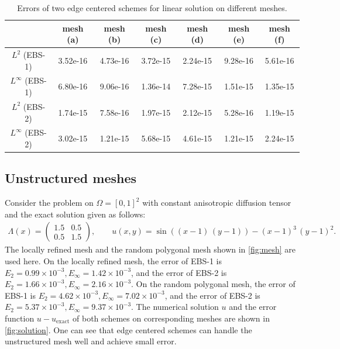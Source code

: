 \documentclass[times,review,preprint,authoryear]{elsarticle}
\begin{document}
\begin{table}[h]
\centering
\begin{tabular}{ccccccc}
\hline
 & mesh (a) & mesh (b) & mesh (c) & mesh (d) & mesh (e) & mesh (f) \\
\hline
$L^2$ (EBS-1) & 3.52e-16 & 4.73e-16 & 3.72e-15 & 2.24e-15 & 9.28e-16 & 5.61e-16 \\
$L^\infty$ (EBS-1) & 6.80e-16 & 9.06e-16 & 1.36e-14 & 7.28e-15 & 1.51e-15 & 1.35e-15 \\
$L^2$ (EBS-2) & 1.74e-15 & 7.58e-16 & 1.97e-15 & 2.12e-15 & 5.28e-16 & 1.19e-15 \\
$L^\infty$ (EBS-2) & 3.02e-15 & 1.21e-15 & 5.68e-15 & 4.61e-15 & 1.21e-15 & 2.24e-15 \\
\hline
\end{tabular}
\caption{Errors of two edge centered schemes for linear solution on different meshes.}
\label{tab:linear}
\end{table}

\subsection{Unstructured meshes}

Consider the problem on $\Omega = [0,1]^2$ with constant anisotropic diffusion tensor and the exact solution given as follows:
\begin{align*}
\Lambda(x) =
\left(
\begin{matrix}
1.5 & 0.5 \\
0.5 & 1.5
\end{matrix}
\right),
\qquad
u(x,y) = \sin((x-1) \, (y-1)) - (x-1)^3 \, (y-1)^2.
\end{align*}
The locally refined mesh and the random polygonal mesh shown in \cref{fig:mesh} are used here. On the locally refined mesh, the error of EBS-1 is $E_2 = 0.99 \times 10^{-3}, E_\infty = 1.42 \times 10^{-3}$, and the error of EBS-2 is $E_2 = 1.66 \times 10^{-3}, E_\infty = 2.16 \times 10^{-3}$. On the random polygonal mesh, the error of EBS-1 is $E_2 = 4.62 \times 10^{-3}, E_\infty = 7.02 \times 10^{-3}$, and the error of EBS-2 is $E_2 = 5.37 \times 10^{-3}, E_\infty = 9.37 \times 10^{-3}$.
The numerical solution $u$ and the error function $u - u_{\text{exact}}$ of both schemes on corresponding meshes are shown in \cref{fig:solution}. 
One can see that edge centered schemes can handle the unstructured mesh well and achieve small error.
\end{document}
